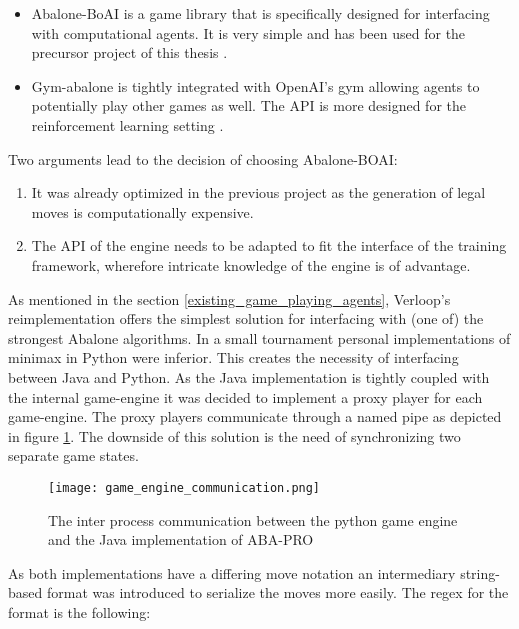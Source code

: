 \begin{itemize}
    \item Abalone-BoAI is a game library that is specifically designed for interfacing with computational agents. It is very simple and has been used for the precursor project of this thesis \cite{scriptim_scriptimabalone-boai_2021}.
    \item Gym-abalone is tightly integrated with OpenAI's gym allowing agents to potentially play other games as well. The API is more designed for the reinforcement learning setting \cite{towzeur_towzeurgym-abalone_2021}.
\end{itemize}

Two arguments lead to the decision of choosing Abalone-BOAI:
\begin{enumerate}
    \item It was already optimized in the previous project as the generation of legal moves is computationally expensive.
    \item The API of the engine needs to be adapted to fit the interface of the training framework, wherefore intricate knowledge of the engine is of advantage.
\end{enumerate}

As mentioned in the section \ref{existing_game_playing_agents}, Verloop's reimplementation \cite{verloop_abaloneai_nodate} offers the simplest solution for interfacing with (one of) the strongest Abalone algorithms. In a small tournament personal implementations of minimax in Python \cite{claussen_abalone_2021} were inferior. This creates the necessity of interfacing between Java and Python. As the Java implementation is tightly coupled with the internal game-engine it was decided to implement a proxy player for each game-engine. The proxy players communicate through a named pipe as depicted in figure \ref{python_java_ipc}. The downside of this solution is the need of synchronizing two separate game states.

\begin{figure}
    \centering
    \texttt{[image: game\_engine\_communication.png]}
    \caption{The inter process communication between the python game engine and the Java implementation of ABA-PRO}
    \label{python_java_ipc}
\end{figure}

As both implementations have a differing move notation an intermediary string-based format was introduced to serialize the moves more easily. The regex for the format is the following:

